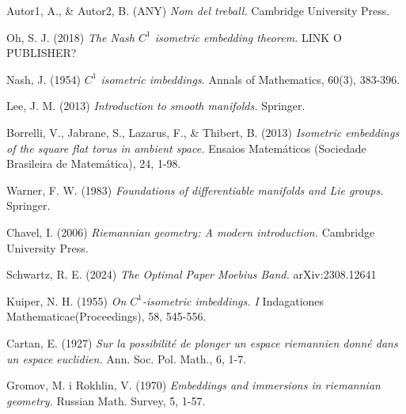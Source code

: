 \documentclass[11pt,a4paper,openright,oneside]{book}
\numberwithin{equation}{section}
\theoremstyle{definition}
\begin{document}
\newpage
\begin{thebibliography}{25}

{ \color{blue} 
Autor1, A., \& Autor2, B. (ANY)
\newblock \textit{Nom del treball.}
\newblock Cambridge University Press.
}

Oh, S. J. (2018)
\newblock \textit{The Nash $C^1$ isometric embedding theorem.}
\newblock LINK O PUBLISHER?

Nash, J. (1954)
\newblock \textit{$C^1$ isometric imbeddings.}
\newblock Annals of Mathematics, 60(3), 383-396.

Lee, J. M. (2013)
\newblock \textit{Introduction to smooth manifolds.}
\newblock Springer.

Borrelli, V., Jabrane, S., Lazarus, F., \& Thibert, B. (2013)
\newblock \textit{Isometric embeddings of the square flat torus in ambient space.}
\newblock Ensaios Matemáticos (Sociedade Brasileira de Matemática), 24, 1-98.

Warner, F. W. (1983)
\newblock \textit{Foundations of differentiable manifolds and Lie groups.}
\newblock Springer.

Chavel, I. (2006)
\newblock \textit{Riemannian geometry: A modern introduction.}
\newblock Cambridge University Press.

Schwartz, R. E. (2024)
\newblock \textit{The Optimal Paper Moebius Band.}
\newblock arXiv:2308.12641

Kuiper, N. H. (1955)
\newblock \textit{On $C^1$-isometric imbeddings. I}
\newblock Indagationes Mathematicae(Proceedings), 58, 545-556.

Cartan, E. (1927)
\newblock \textit{Sur la possibilité de plonger un espace riemannien donné dans un espace euclidien.}
\newblock Ann. Soc. Pol. Math., 6, 1-7.

Gromov, M. i Rokhlin, V. (1970)
\newblock \textit{Embeddings and immersions in riemannian geometry.}
\newblock Russian Math. Survey, 5, 1-57.



\end{thebibliography}
\end{document}
